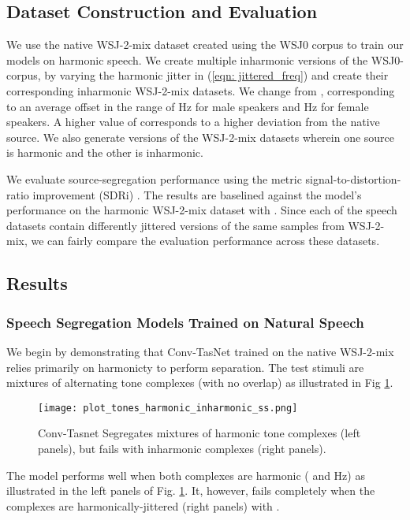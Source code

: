 \documentclass{article}
\begin{document}
\subsection{Dataset Construction and Evaluation} \label{sec:Datasets}
We use the native WSJ-2-mix dataset \cite{hershey2016deep} created using the WSJ0 corpus to train our models on harmonic speech. We create multiple inharmonic versions of the WSJ0-corpus, by varying the harmonic jitter  in (\ref{eqn: jittered_freq}) and create their corresponding inharmonic WSJ-2-mix datasets. We change  from , corresponding to an average offset in the range of  Hz for male speakers and  Hz for female speakers. A higher value of  corresponds to a higher deviation from the native source. We also generate versions of the WSJ-2-mix datasets wherein one source is harmonic and the other is inharmonic. 

We evaluate source-segregation performance using the metric signal-to-distortion-ratio improvement (SDRi) \cite{vincent2006performance}. The results are baselined against the model's performance on the harmonic WSJ-2-mix dataset with . Since each of the speech datasets contain differently jittered versions of the same samples from WSJ-2-mix, we can fairly compare the evaluation performance across these datasets.






\subsection{Results} \label{sec:Results}
\subsubsection{Speech Segregation Models Trained on Natural Speech}
We begin by demonstrating that Conv-TasNet trained on the native WSJ-2-mix relies primarily on harmonicty to perform separation. The test stimuli are mixtures of alternating tone complexes (with no overlap) as illustrated in Fig \ref{fig:plot_tones_harmonic_inharmonic}.
\begin{figure}[!htbp]
  \centering
  \texttt{[image: plot\_tones\_harmonic\_inharmonic\_ss.png]}
  \caption{Conv-Tasnet Segregates mixtures of harmonic tone complexes (left panels), but  fails with inharmonic complexes (right panels).}
  \label{fig:plot_tones_harmonic_inharmonic}
\end{figure}
The model performs well when both complexes are harmonic ( and  Hz) as illustrated in the left panels of Fig. \ref{fig:plot_tones_harmonic_inharmonic}. It, however, fails completely  when the complexes are harmonically-jittered (right panels) with . 
\end{document}
